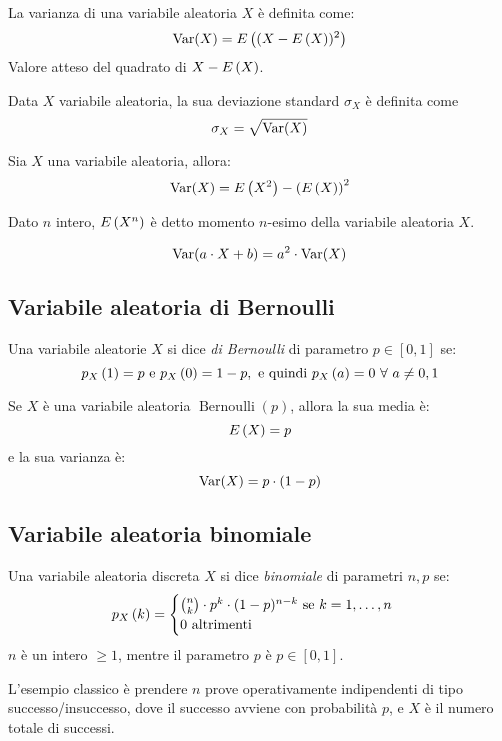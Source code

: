 \begin{defn}[Varianza]
La varianza di una variabile aleatoria $X$ \`e definita come:
\[
\operatorname{Var}(X) = E \left( (X - E \left( X \right))^2 \right)
\]
Valore atteso del quadrato di $X - E \left( X \right)$.
\end{defn}

\begin{defn}
Data $X$ variabile aleatoria, la sua deviazione standard $\sigma_X$ \`e definita come
\[
\sigma_X = \sqrt{ \operatorname{Var} (X)}
\]
\end{defn}

\begin{prop}
Sia $X$ una variabile aleatoria, allora:
\[
\operatorname{Var} (X) = E \left( X^2 \right) - {\left( E \left( X \right) \right)}^2
\]
\end{prop}

\begin{defn}
Dato $n$ intero, $E \left( X^n \right)$ \`e detto momento $n$-esimo della variabile aleatoria $X$.
\end{defn}

\begin{prop}
\[
\operatorname{Var} (a \cdot X + b) = a^2 \cdot \operatorname{Var} (X)
\]
\end{prop}

\subsection{Variabile aleatoria di Bernoulli}

\begin{defn}
Una variabile aleatorie $X$ si dice \emph{di Bernoulli} di parametro $p \in [0,1]$ se:
\[
\mass{1} = p \text{ e } \mass{0} = 1 - p, \text{ e quindi } \mass{a} = 0 \forall a \neq 0,1
\]
\end{defn}
\begin{fact}
Se $X$ \`e una variabile aleatoria $\operatorname{Bernoulli}(p)$, allora la sua media \`e:
\[
E \left( X \right) = p
\]
e la sua varianza \`e:
\[
\operatorname{Var} (X) = p \cdot (1-p)
\]
\end{fact}

\subsection{Variabile aleatoria binomiale}

\begin{defn}
Una variabile aleatoria discreta $X$ si dice \emph{binomiale} di parametri $n, p$ se:
\[
p_{X} \left( k \right) =
\begin{cases}
\binom{n}{k} \cdot p^k \cdot (1 - p)^{n - k} \text{ se } k = 1, \dots, n \\
0 \text{ altrimenti}
\end{cases}
\]
$n$ \`e un intero $\ge 1$, mentre il parametro $p$ \`e $p \in [0,1]$.
\end{defn}
L'esempio classico \`e prendere $n$ prove operativamente indipendenti di tipo successo/insuccesso, dove il successo avviene con probabilit\`a $p$, e $X$ \`e il numero totale di successi.

